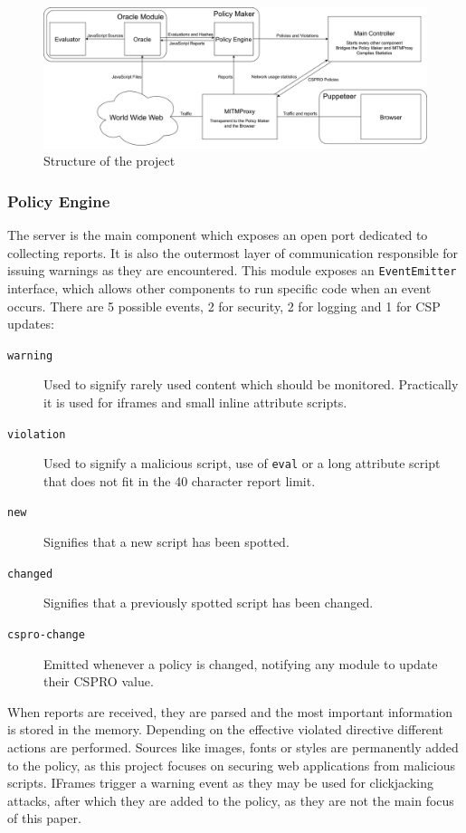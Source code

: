 \begin{figure}[h]
	\centering
	\includegraphics[width=\textwidth]{imgs/project_structure.png}
	\caption{Structure of the project}
	\label{structure}
\end{figure}

\subsubsection{Policy Engine}
The server is the main component which exposes an open port dedicated to collecting reports.
It is also the outermost layer of communication responsible for issuing warnings as they are encountered.
This module exposes an \texttt{EventEmitter} interface, which allows other components to run specific code when an event occurs.
There are 5 possible events, 2 for security, 2 for logging and 1 for CSP updates:
\begin{description}
	\item[\texttt{warning}]	Used to signify rarely used content which should be monitored. Practically it is used for iframes and small inline attribute scripts. 
	\item[\texttt{violation}] Used to signify a malicious script, use of \texttt{eval} or a long attribute script that does not fit in the 40 character report limit.
	\item[\texttt{new}] Signifies that a new script has been spotted.
	\item[\texttt{changed}] Signifies that a previously spotted script has been changed.
	\item[\texttt{cspro-change}] Emitted whenever a policy is changed, notifying any module to update their CSPRO value.
\end{description}

When reports are received, they are parsed and the most important information is stored in the memory.
Depending on the effective violated directive different actions are performed.
Sources like images, fonts or styles are permanently added to the policy, as this project focuses on securing web applications from malicious scripts.
IFrames trigger a warning event as they may be used for clickjacking attacks, after which they are added to the policy, as they are not the main focus of this paper.

